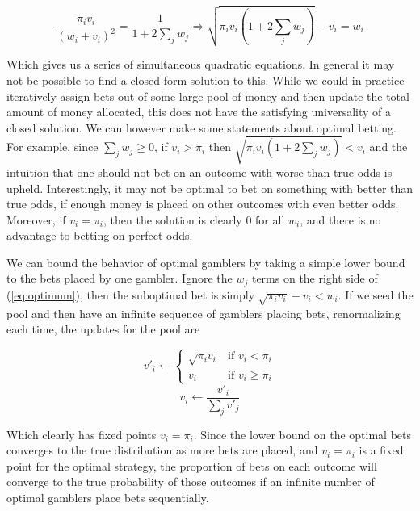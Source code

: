 \documentclass[11pt]{article}
\begin{document}
\begin{equation}
\frac{\pi_i v_i}{(w_i + v_i)^2} = \frac{1}{1+2\sum_j w_j} \Rightarrow \sqrt{\pi_i v_i (1+ 2\sum_j w_j)} -v_i = w_i
\label{eq:optimum}
\end{equation}

Which gives us a series of simultaneous quadratic equations.  In general it may not be possible to find a closed form solution to this.  While we could in practice iteratively assign bets out of some large pool of money and then update the total amount of money allocated, this does not have the satisfying universality of a closed solution.  We can however make some statements about optimal betting.  For example, since $\sum_j w_j \ge 0$, if $v_i > \pi_i$ then $\sqrt{\pi_i v_i (1 + 2\sum_j w_j)} < v_i$ and the intuition that one should not bet on an outcome with worse than true odds is upheld.  Interestingly, it may not be optimal to bet on something with better than true odds, if enough money is placed on other outcomes with even better odds.  Moreover, if $v_i = \pi_i$, then the solution is clearly 0 for all $w_i$, and there is no advantage to betting on perfect odds.

We can bound the behavior of optimal gamblers by taking a simple lower bound to the bets placed by one gambler.  Ignore the $w_j$ terms on the right side of (\ref{eq:optimum}), then the suboptimal bet is simply $\sqrt{\pi_i v_i} - v_i < w_i$.  If we seed the pool and then have an infinite sequence of gamblers placing bets, renormalizing each time, the updates for the pool are

\begin{equation}
v'_i \leftarrow 
\begin{cases}
\sqrt{\pi_i v_i} & \text{if $v_i < \pi_i$} \\
 v_i & \text{if $v_i \ge \pi_i$}
\end{cases}
\end{equation}
\begin{equation}
v_i \leftarrow \frac{v'_i}{\sum_j v'_j}
\end{equation}

Which clearly has fixed points $v_i = \pi_i$.  Since the lower bound on the optimal bets converges to the true distribution as more bets are placed, and $v_i = \pi_i$ is a fixed point for the optimal strategy, the proportion of bets on each outcome will converge to the true probability of those outcomes if an infinite number of optimal gamblers place bets sequentially.
\end{document}
